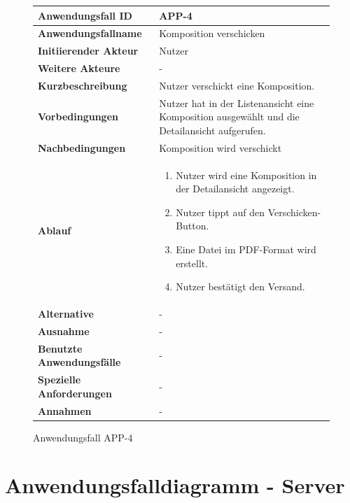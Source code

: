 \begin{figure}[h]
	\centering
	\begin{tabularx}{\textwidth}{ X | X }
		\textbf{Anwendungsfall ID} & APP-4 \\ \hline
		\textbf{Anwendungsfallname} & Komposition verschicken \\ \hline
		\textbf{Initiierender Akteur} & Nutzer
		 \\ \hline
		\textbf{Weitere Akteure} & -  \\ \hline
		\textbf{Kurzbeschreibung} & Nutzer verschickt eine Komposition.  \\ \hline
		\textbf{Vorbedingungen} & Nutzer hat in der Listenansicht eine Komposition ausgewählt und die Detailansicht aufgerufen.  \\ \hline
		\textbf{Nachbedingungen} & Komposition wird verschickt  \\ \hline
		\textbf{Ablauf} &
		\begin{enumerate}
			\item Nutzer wird eine Komposition in der Detailansicht angezeigt.
			\item Nutzer tippt auf den Verschicken-Button.
			\item Eine Datei im PDF-Format wird erstellt.
			\item Nutzer bestätigt den Versand.
		\end{enumerate} \\ \hline
		\textbf{Alternative} &
		-  \\ \hline
		\textbf{Ausnahme} &
		- \\ \hline
		\textbf{Benutzte Anwendungsfälle} & - \\ \hline
		\textbf{Spezielle Anforderungen} & - \\ \hline
		\textbf{Annahmen} & -
	\end{tabularx}
	\caption{Anwendungsfall APP-4}
	\label{fig:anwendungsfall-app-tabelle-APP-4}
\end{figure}

\newpage


\section{Anwendungsfalldiagramm - Server}

